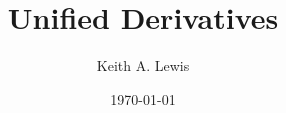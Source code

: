\documentclass[11pt,fleqn]{amsart}
\begin{document}
 

\author{Keith A. Lewis} 
\title{Unified Derivatives} 
\date{\today} 



% 
% 
\end{document}
